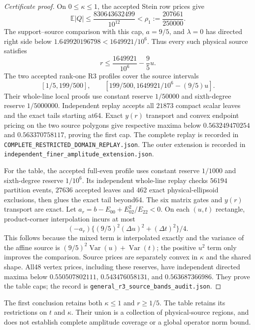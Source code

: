\documentclass[11pt]{article}
\begin{document}
\begin{proof}[Certificate proof]
On $0\leq\kappa\leq1$, the accepted Stein row prices give
\[
 \mathbb E|Q|\leq\frac{830643632499}{10^{12}}
 <\rho_1:=\frac{207661}{250000}.
\]
The support--source comparison with this cap, $a=9/5$, and
$\lambda=0$ has directed right side below
$1.649920196798<1649921/10^6$.  Thus every such physical
source satisfies
\[
 r\leq\frac{1649921}{10^6}-\frac95u.
\]
The two accepted rank-one R3 profiles cover the source intervals
\[
 [1/5,199/500],\qquad[199/500,1649921/10^6-(9/5)u].
\]  Their whole-line local proofs use
constant reserve $1/50000$ and sixth-degree reserve $1/5000000$.
Independent replay accepts all $21873$ compact scalar leaves and the
exact tails starting at64.  Exact $y(r)$ transport and convex
endpoint pricing on the two source polygons give respective maxima
below $0.563249470254$ and $0.563370758117$, proving the first cap.
The complete replay is recorded in
\texttt{COMPLETE\_\allowbreak RESTRICTED\_\allowbreak DOMAIN\_\allowbreak REPLAY.json}.
The outer extension is recorded in
\texttt{independent\_\allowbreak finer\_\allowbreak amplitude\_\allowbreak extension.json}.

For the table, the accepted full-even profile uses constant reserve
$1/1000$ and sixth-degree reserve $1/10^6$.
Its independent whole-line replay checks $56194$ partition events,
$27636$ accepted leaves and $462$ exact physical-ellipsoid exclusions,
then glues the exact tail beyond64.  The six matrix gates and
$y(r)$ transport are exact.  Let
$a_r=b-E_{00}+E_{02}^2/E_{22}<0$.  On each $(u,t)$ rectangle,
product-corner interpolation incurs at most
\[
 (-a_r)\{(9/5)^2(\Delta u)^2+(\Delta t)^2\}/4.
\]
This follows because the mixed term is interpolated exactly and the
variance of the affine source is $(9/5)^2\operatorname{Var}(u)+
\operatorname{Var}(t)$; the positive $u^2$ term only improves the
comparison.  Source prices are separately convex in $\kappa$ and
the shared shape.  All48 vertex prices, including these reserves,
have independent directed maxima below
$0.550507802111$, $0.543476058131$, and $0.563687366986$.
They prove the table caps; the record is
\texttt{general\_r3\_source\_bands\_audit.json}.
\end{proof}
The first conclusion retains both $\kappa\leq1$ and $r\geq1/5$.
The table retains its restrictions on $t$ and $\kappa$.
Their union is a collection of physical-source regions, and does not
establish complete amplitude coverage or a global operator norm bound.
\end{document}
